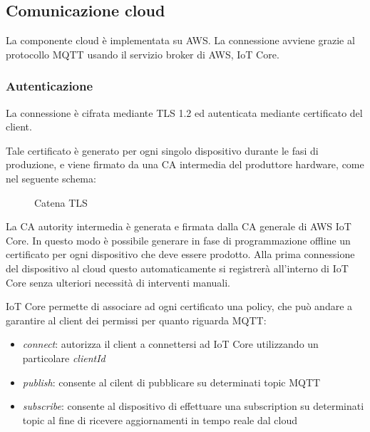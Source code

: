 \documentclass[12pt,a4paper,twoside,titlepage]{book}
\begin{document}
\subsection{Comunicazione cloud}

La componente cloud è implementata su AWS. La connessione avviene grazie al protocollo
MQTT usando il servizio broker di AWS, IoT Core.

\subsubsection{Autenticazione}
La connessione è cifrata mediante TLS 1.2 ed autenticata mediante certificato del client. 

Tale certificato è generato per ogni singolo dispositivo durante le fasi di produzione, 
e viene firmato da una CA intermedia del produttore hardware, come nel seguente schema: 

\begin{figure}[ht]
    \centering
    \caption{Catena TLS}
    \label{fig:tls-chain}
\end{figure}

La CA autority intermedia è generata e firmata dalla CA generale di AWS IoT Core. In questo 
modo è possibile generare in fase di programmazione offline un certificato per ogni 
dispositivo che deve essere prodotto. Alla prima connessione del dispositivo al cloud questo 
automaticamente si registrerà all'interno di IoT Core senza ulteriori necessità di interventi manuali. 

IoT Core permette di associare ad ogni certificato una policy, che può andare a garantire al 
client dei permissi per quanto riguarda MQTT:
\begin{itemize}
    \item \textit{connect}: autorizza il client a connettersi ad IoT Core utilizzando un particolare 
        \textit{clientId}
    \item \textit{publish}: consente al cilent di pubblicare su determinati topic MQTT
    \item \textit{subscribe}: consente al dispositivo di effettuare una subscription su determinati topic 
        al fine di ricevere aggiornamenti in tempo reale dal cloud
\end{itemize}
\end{document}

